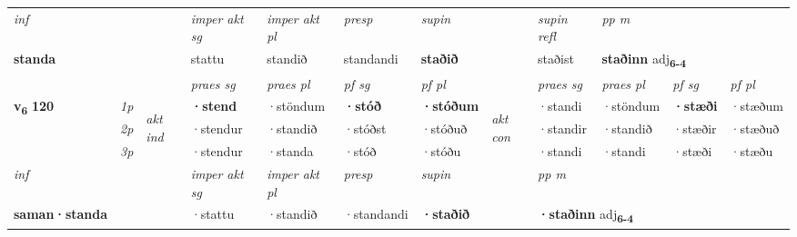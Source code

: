 \begin{longtable}[l]{X>{\footnotesize\itshape}llXXXXlXXXX}
\cmidrule{4-7}
   {\textit{inf}} & &  & \textit{imper akt sg} & \textit{imper akt pl}   & \textit{presp} & \textit{supin} && \textit{supin refl} & \textit{pp m} \\*
  {\textbf{standa}} & && stattu  & standið   & standandi &  \textbf{staðið} && staðist & \multicolumn{2}{l}{\textbf{staðinn} adj\textbf{\textsubscript{6-4}}} \\*

\midrule

 & &   & \textit{praes sg}  & \textit{praes pl}    & \textit{ pf sg} & \textit{pf pl} & & \textit{praes sg}  & \textit{praes pl}    & \textit{pf sg} & \textit{pf pl }  \\ \cmidrule{4-7} \cmidrule{9-12}
 \multirow{2}{*}{{{\textbf{v{\textsubscript{6}}} \Large{\textbf{120}}}}}  & 1p & \multirow{3}{*}{\begin{turn}{90}\textit{akt ind}\end{turn}} & \textbf{·stend} & ·stöndum & \textbf{·stóð} & \textbf{·stóðum} & \multirow{3}{*}{\begin{turn}{90}\textit{akt con}\end{turn}} &·standi & ·stöndum & \textbf{·stæði} & ·stæðum\\*
 & 2p &  &  ·stendur  & ·standið & ·stóðst & ·stóðuð & & ·standir & ·standið & ·stæðir & ·stæðuð \\*
 & 3p &  & ·stendur & ·standa & ·stóð & ·stóðu & & ·standi & ·standi& ·stæði & ·stæðu \\*
\cmidrule{4-7} \cmidrule{9-12}

   {\textit{inf}} & &  & \textit{imper akt sg} & \textit{imper akt pl}   & \textit{presp} & \textit{supin}  && \textit{pp m} \\*
  {\textbf{saman\allowbreak ·standa}} & && ·stattu  & ·standið   & ·standandi &  \textbf{·staðið}  && \multicolumn{2}{l}{\textbf{·staðinn} adj\textbf{\textsubscript{6-4}}} \\*

\midrule


\end{longtable}
